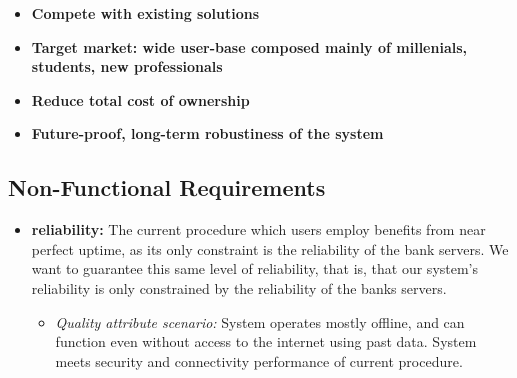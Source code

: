 \begin{itemize}
    \item \textbf{Compete with existing solutions}
    \item \textbf{Target market: wide user-base composed mainly of millenials, students, new professionals}
    \item \textbf{Reduce total cost of ownership}
    \item \textbf{Future-proof, long-term robustiness of the system}
\end{itemize}


\subsection{Non-Functional Requirements}

\begin{itemize}
     \item \textbf{reliability:} The current procedure which users employ benefits from near perfect uptime, as its only constraint is the reliability of the bank servers. We want to guarantee this same level of reliability, that is, that our system's reliability is only constrained by the reliability of the banks servers.
    \begin{itemize}
        \item \textit{Quality attribute scenario:} System operates mostly offline, and can function even without access to the internet using past data. System meets security and connectivity performance of current procedure.
     \end{itemize}


\end{itemize}
